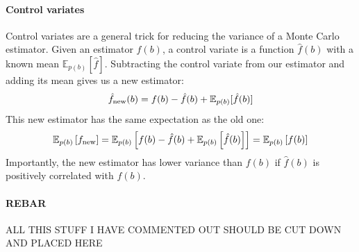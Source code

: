 \documentclass{article}
\newcommand{\controlf}{\hat f}  %
\begin{document}
\paragraph{Control variates}
Control variates are a general trick for reducing the variance of a Monte Carlo estimator.
Given an estimator $f(b)$, a control variate is a function $\controlf(b)$ with a known mean $\mathbb{E}_{p(b)} \left[ \controlf \right]$.
Subtracting the control variate from our estimator and adding its mean gives us a new estimator:
%
\begin{align}
\hat f_\textnormal{new}(b) = f(b) - \controlf(b) + \mathbb{E}_{p(b)}[\controlf(b)]
\end{align}
%
This new estimator has the same expectation as the old one:
%
\begin{align}
\mathbb{E}_{p(b)}\left[ f_\textnormal{new} \right] 
= \mathbb{E}_{p(b)}\left[f(b) - \controlf(b) + \mathbb{E}_{p(b)} \left[ \controlf(b) \right] \right]
= \mathbb{E}_{p(b)}\left[ f(b) \right]
\end{align}
%
Importantly, the new estimator has lower variance than $f(b)$ if $\controlf(b)$ is positively correlated with $f(b)$.

\paragraph{REBAR}
ALL THIS STUFF I HAVE COMMENTED OUT SHOULD BE CUT DOWN AND PLACED HERE

\end{document}
